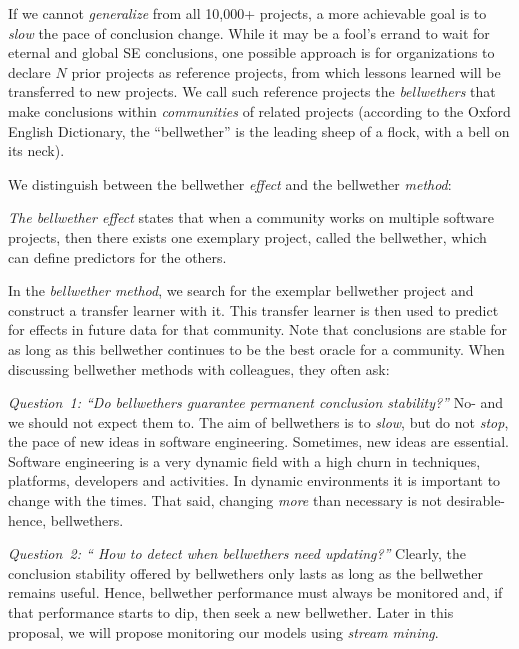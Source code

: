  

If we cannot {\em generalize} 
from all 10,000+ projects, a more achievable goal is to {\em
slow} the pace of conclusion change.
While it may be a fool's errand to wait for eternal and global SE conclusions, one possible approach is for organizations to declare $N$ prior projects as 
 reference projects, from which lessons learned will be transferred to new projects. 
 We call such reference projects the {\em bellwethers}
that make conclusions 
within {\em communities} of related projects (according to the Oxford English Dictionary, the
``bellwether'' is the leading sheep of a flock, with a bell on its neck).

We  distinguish between the bellwether {\em effect}
and the bellwether {\em  method}:
\bi
\item \textit{The bellwether effect} states that when a community works on 
multiple software projects, then  there exists one exemplary project, called the bellwether,
which can define   predictors for the others.
\item In the \textit{bellwether method}, we search for the exemplar bellwether project and construct a transfer learner with it. This transfer learner is then used to predict for effects in future data for that community.
\ei
 Note that conclusions are stable
for as long as this bellwether continues to be the best oracle for a community. 
When discussing bellwether methods with colleagues, they often ask:
\bi
\item
{\em Question~1: ``Do bellwethers guarantee permanent conclusion stability?''} No- and we should not expect them to. The aim of bellwethers is to {\em slow}, but do not  {\em stop}, the pace of new ideas in software engineering. Sometimes, new ideas are essential. Software engineering is a very dynamic field with a high churn in techniques, platforms, developers and activities. In  dynamic environments it is important to change with the times. That said, changing {\em more} than necessary is not desirable- hence, bellwethers. 
\item
{\em Question~2: `` How to detect when bellwethers need updating?''} 
Clearly, the conclusion stability offered by bellwethers only lasts as long as the bellwether remains useful. Hence, bellwether performance must always be monitored and, if that performance starts to dip, then seek a new bellwether. Later in this proposal, we will propose monitoring our models using {\em stream mining}. 
\ei
